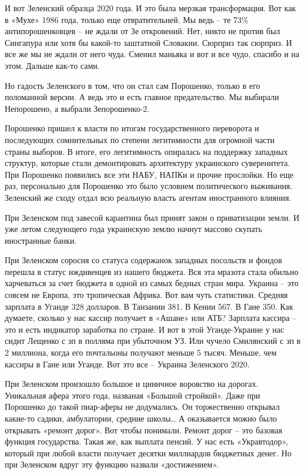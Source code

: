 И вот Зеленский образца 2020 года. И это была мерзкая трансформация. Вот как в
«Мухе» 1986 года, только еще отвратительней. Мы ведь – те 73\% антипорошенковцев
– не ждали от Зе откровений. Нет, никто не против был Сингапура или хотя бы
какой-то заштатной Словакии. Сюрприз так сюрприз. И все же мы не ждали от него
чуда. Сменил маньяка и вот и все чудо, спасибо и на этом. Дальше как-то сами.

Но гадость Зеленского в том, что он стал сам Порошенко, только в его поломанной
версии. А ведь это и есть главное предательство. Мы выбирали Непорошено, а
выбрали Зепорошенко-2.

Порошенко пришел к власти по итогам государственного переворота и последующих
сомнительных по степени легитимности для огромной части страны выборов. В
итоге, его легитимность опиралась на поддержку западных структур, которые стали
демонтировать архитектуру украинского суверенитета. При Порошенко появились все
эти НАБУ, НАПКи и прочие прослойки. Но еще раз, персонально для Порошенко это
было условием политического выживания. Зеленский же сходу отдал всю реальную
власть агентам иностранного влияния.

При Зеленском под завесой карантина был принят закон о приватизации земли. И
уже летом следующего года украинскую землю начнут массово скупать иностранные
банки.

При Зеленском соросня со статуса содержанок западных посольств и фондов перешла
в статус иждивенцев из нашего бюджета. Вся эта мразота стала обильно
харчеваться за счет бюджета в одной из самых бедных стран мира. Украина – это
совсем не Европа, это тропическая Африка. Вот вам чуть статистики. Средняя
зарплата в Уганде 328 долларов. В Танзании 381. В Кении 567. В Гане 350. Как
думаете, сколько у нас кассир получает в «Ашане» или АТБ? Зарплата кассира –
это и есть индикатор заработка по стране. И вот в этой Уганде-Украине у нас
сидит Лещенко с зп в полляма при убыточном УЗ. Или чучело Смилянский с зп в 2
миллиона, когда его почтальоны получают меньше 5 тысяч. Меньше, чем кассиры в
Гане или Уганде. Вот это все – Украина Зеленского 2020.

При Зеленском произошло большое и циничное воровство на дорогах. Уникальная
афера этого года, названая «Большой стройкой». Даже при Порошенко до такой
пиар-аферы не додумались. Он торжественно открывал какие-то садики,
амбулатории, средние школы… А оказывается можно было открывать «ремонт дорог».
Вот чтобы понимали. Ремонт дорог – это базовая функция государства. Такая же,
как выплата пенсий. У нас есть «Укравтодор», который при любой власти получает
десятки миллиардов бюджетных денег. Но при Зеленском вдруг эту функцию назвали
«достижением».

